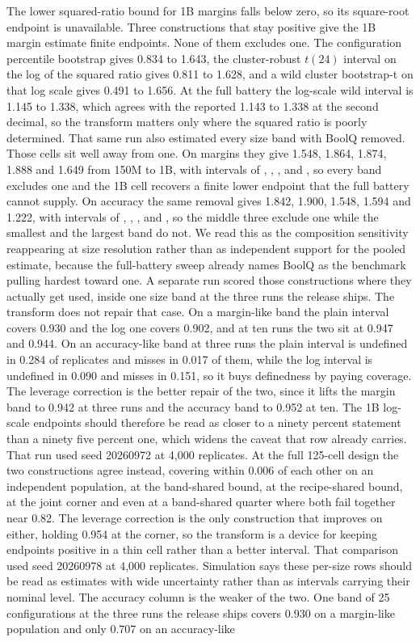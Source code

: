The lower squared-ratio bound for 1B margins falls below zero, so its square-root endpoint is unavailable. Three constructions that stay positive give the 1B margin estimate finite endpoints. None of them excludes one. The configuration percentile bootstrap gives 0.834 to 1.643, the cluster-robust $t(24)$ interval on the log of the squared ratio gives 0.811 to 1.628, and a wild cluster bootstrap-t on that log scale gives 0.491 to 1.656. At the full battery the log-scale wild interval is 1.145 to 1.338, which agrees with the reported 1.143 to 1.338 at the second decimal, so the transform matters only where the squared ratio is poorly determined. That same run also estimated every size band with BoolQ removed. Those cells sit well away from one. On margins they give 1.548, 1.864, 1.874, 1.888 and 1.649 from 150M to 1B, with intervals of , , ,  and , so every band excludes one and the 1B cell recovers a finite lower endpoint that the full battery cannot supply. On accuracy the same removal gives 1.842, 1.900, 1.548, 1.594 and 1.222, with intervals of , , ,  and , so the middle three exclude one while the smallest and the largest band do not. We read this as the composition sensitivity reappearing at size resolution rather than as independent support for the pooled estimate, because the full-battery sweep already names BoolQ as the benchmark pulling hardest toward one. A separate run scored those constructions where they actually get used, inside one size band at the three runs the release ships. The transform does not repair that case. On a margin-like band the plain interval covers 0.930 and the log one covers 0.902, and at ten runs the two sit at 0.947 and 0.944. On an accuracy-like band at three runs the plain interval is undefined in 0.284 of replicates and misses in 0.017 of them, while the log interval is undefined in 0.090 and misses in 0.151, so it buys definedness by paying coverage. The leverage correction is the better repair of the two, since it lifts the margin band to 0.942 at three runs and the accuracy band to 0.952 at ten. The 1B log-scale endpoints should therefore be read as closer to a ninety percent statement than a ninety five percent one, which widens the caveat that row already carries. That run used seed 20260972 at 4,000 replicates. At the full 125-cell design the two constructions agree instead, covering within 0.006 of each other on an independent population, at the band-shared bound, at the recipe-shared bound, at the joint corner and even at a band-shared quarter where both fail together near 0.82. The leverage correction is the only construction that improves on either, holding 0.954 at the corner, so the transform is a device for keeping endpoints positive in a thin cell rather than a better interval. That comparison used seed 20260978 at 4,000 replicates. Simulation says these per-size rows should be read as estimates with wide uncertainty rather than as intervals carrying their nominal level. The accuracy column is the weaker of the two. One band of 25 configurations at the three runs the release ships covers 0.930 on a margin-like population and only 0.707 on an accuracy-like 